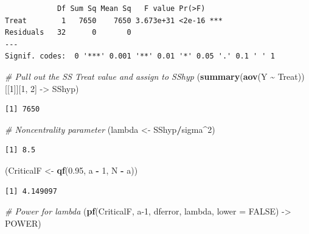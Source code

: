 \documentclass[
]{article}
\newenvironment{Shaded}{\begin{snugshade}}{\end{snugshade}}
\newcommand{\AttributeTok}[1]{\textcolor[rgb]{0.13,0.29,0.53}{#1}}
\newcommand{\CommentTok}[1]{\textcolor[rgb]{0.56,0.35,0.01}{\textit{#1}}}
\newcommand{\ConstantTok}[1]{\textcolor[rgb]{0.56,0.35,0.01}{#1}}
\newcommand{\DecValTok}[1]{\textcolor[rgb]{0.00,0.00,0.81}{#1}}
\newcommand{\FloatTok}[1]{\textcolor[rgb]{0.00,0.00,0.81}{#1}}
\newcommand{\FunctionTok}[1]{\textcolor[rgb]{0.13,0.29,0.53}{\textbf{#1}}}
\newcommand{\NormalTok}[1]{#1}
\newcommand{\OtherTok}[1]{\textcolor[rgb]{0.56,0.35,0.01}{#1}}
\newcommand{\SpecialCharTok}[1]{\textcolor[rgb]{0.81,0.36,0.00}{\textbf{#1}}}
\begin{document}
\begin{verbatim}
            Df Sum Sq Mean Sq   F value Pr(>F)    
Treat        1   7650    7650 3.673e+31 <2e-16 ***
Residuals   32      0       0                     
---
Signif. codes:  0 '***' 0.001 '**' 0.01 '*' 0.05 '.' 0.1 ' ' 1
\end{verbatim}

\begin{Shaded}
\begin{Highlighting}[]
\CommentTok{\# Pull out the SS Treat value and assign to SShyp}
\NormalTok{(}\FunctionTok{summary}\NormalTok{(}\FunctionTok{aov}\NormalTok{(Y }\SpecialCharTok{\textasciitilde{}}\NormalTok{ Treat))[[}\DecValTok{1}\NormalTok{]][}\DecValTok{1}\NormalTok{, }\DecValTok{2}\NormalTok{] }\OtherTok{{-}\textgreater{}}\NormalTok{ SShyp) }
\end{Highlighting}
\end{Shaded}

\begin{verbatim}
[1] 7650
\end{verbatim}

\begin{Shaded}
\begin{Highlighting}[]
\CommentTok{\# Noncentrality parameter}
\NormalTok{(lambda }\OtherTok{\textless{}{-}}\NormalTok{ SShyp}\SpecialCharTok{/}\NormalTok{sigma}\SpecialCharTok{\^{}}\DecValTok{2}\NormalTok{)}
\end{Highlighting}
\end{Shaded}

\begin{verbatim}
[1] 8.5
\end{verbatim}

\begin{Shaded}
\begin{Highlighting}[]
\NormalTok{(CriticalF }\OtherTok{\textless{}{-}} \FunctionTok{qf}\NormalTok{(}\FloatTok{0.95}\NormalTok{, a }\SpecialCharTok{{-}} \DecValTok{1}\NormalTok{, N }\SpecialCharTok{{-}}\NormalTok{ a))}
\end{Highlighting}
\end{Shaded}

\begin{verbatim}
[1] 4.149097
\end{verbatim}

\begin{Shaded}
\begin{Highlighting}[]
\CommentTok{\# Power for lambda}
\NormalTok{(}\FunctionTok{pf}\NormalTok{(CriticalF, a}\DecValTok{{-}1}\NormalTok{, dferror, lambda, }\AttributeTok{lower =} \ConstantTok{FALSE}\NormalTok{) }\OtherTok{{-}\textgreater{}}\NormalTok{ POWER)}
\end{Highlighting}
\end{Shaded}
\end{document}
